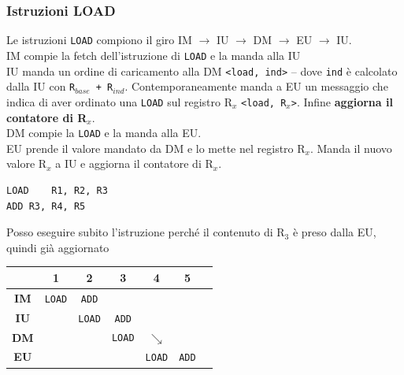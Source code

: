 \documentclass[10pt]{report}
\begin{document}
\subsubsection{Istruzioni LOAD}
Le istruzioni \texttt{LOAD} compiono il giro IM $\rightarrow$ IU $\rightarrow$ DM $\rightarrow$ EU $\rightarrow$ IU.\\
IM compie la fetch dell'istruzione di \texttt{LOAD} e la manda alla IU\\IU manda un ordine di caricamento alla DM \texttt{<load, ind>} -- dove \texttt{ind} è calcolato dalla IU con \texttt{R$_{base}$ + R$_{ind}$}. Contemporaneamente manda a EU un messaggio che indica di aver ordinato una \texttt{LOAD} sul registro R$_x$ \texttt{<load, R$_x$>}. Infine \textbf{aggiorna il contatore di R$_x$}.\\
DM compie la \texttt{LOAD} e la manda alla EU.\\
EU prende il valore mandato da DM e lo mette nel registro R$_x$. Manda il nuovo valore R$_x$ a IU e aggiorna il contatore di R$_x$.
\begin{multicols}{2}
\begin{lstlisting}
LOAD	R1, R2, R3
ADD	R3, R4, R5
\end{lstlisting}
Posso eseguire subito l'istruzione perché il contenuto di R$_3$ è preso dalla EU, quindi già aggiornato
\columnbreak

\begin{tabular}{c|c|c|c|c|c|c|}
	 & 1 & 2 & 3 & 4 & 5 & \\
	\hline
	\textbf{IM} & \texttt{LOAD} & \texttt{ADD} & & & & \\
	\hline
	\textbf{IU} & & \texttt{LOAD} & \texttt{ADD} & & & \\
	\hline
	\textbf{DM} & & & \texttt{LOAD} & $\searrow$ & & \\
	\hline
	\textbf{EU} & & & &\texttt{LOAD} & \texttt{ADD}  & \\
	\hline
\end{tabular}
\end{multicols}
\end{document}
